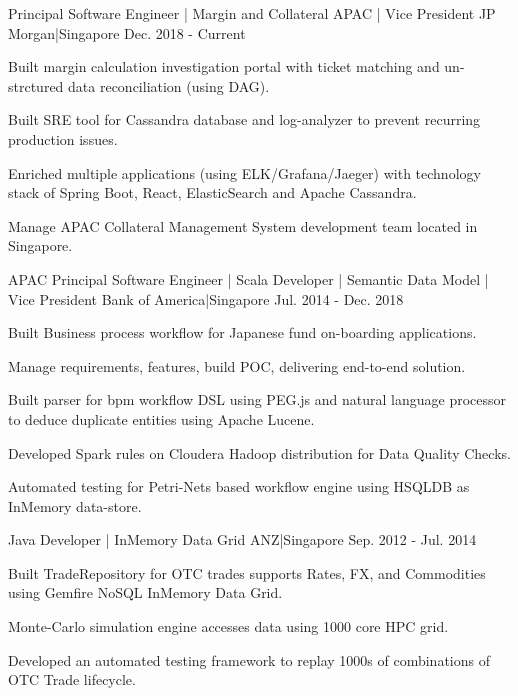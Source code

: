 \begin{cventries}
    {Principal Software Engineer | Margin and Collateral APAC | Vice President }
    {JP Morgan|Singapore}
    {Dec. 2018 - Current}
    {
      \begin{cvitems}
        \item {Built margin calculation investigation portal with ticket matching and un-strctured data reconciliation (using DAG).}
        \item {Built SRE tool for Cassandra database and log-analyzer to prevent recurring production issues.}
        \item {Enriched multiple applications (using ELK/Grafana/Jaeger) with technology stack of Spring Boot, React, ElasticSearch and Apache Cassandra.}
        \item {Manage APAC Collateral Management System development team located in Singapore.}
      \end{cvitems}
    }
    {APAC Principal Software Engineer | Scala Developer | Semantic Data Model | Vice President}
    {Bank of America|Singapore}
    {Jul. 2014 - Dec. 2018}
    {
      \begin{cvitems}
        \item {Built Business process workflow for Japanese fund on-boarding applications.}
        \item {Manage requirements, features, build POC, delivering end-to-end solution.}
        \item {Built parser for bpm workflow DSL using PEG.js and natural language processor to deduce duplicate entities using Apache Lucene.}
        \item {Developed Spark rules on Cloudera Hadoop distribution for Data Quality Checks.}
        \item {Automated testing for Petri-Nets based workflow engine using HSQLDB as InMemory data-store.}
      \end{cvitems}
    }
    {Java Developer | InMemory Data Grid}
    {ANZ|Singapore}
    {Sep. 2012 - Jul. 2014}
    {
      \begin{cvitems}
        \item {Built TradeRepository for OTC trades  supports Rates, FX, and Commodities using Gemfire NoSQL InMemory Data Grid.}
        \item {Monte-Carlo simulation engine accesses data using 1000 core HPC grid.}
        \item {Developed an automated testing framework to replay 1000s of combinations of OTC Trade lifecycle.}

\end{cvitems}}
\end{cventries}

